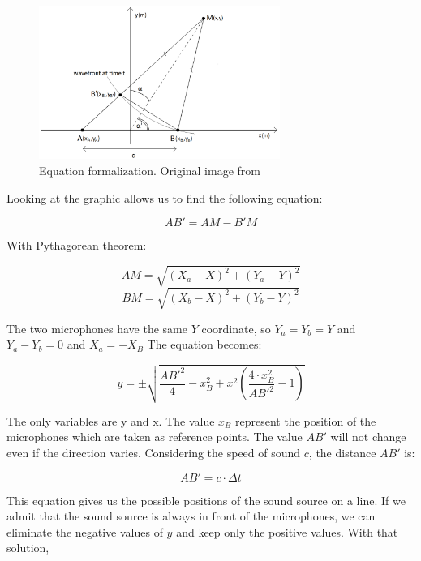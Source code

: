 \begin{figure}[H]
    \centering
    \includegraphics[width=0.7\textwidth]{../Images/sound-source-from-two-microphones.png}
    \caption{Equation formalization. Original image from \cite{Scola2010DirectionOA}}
    \label{fig:sound-source-from-two-microphones}
\end{figure}

Looking at the graphic allows us to find the following equation:

\begin{equation}
    AB' = AM-B'M
\end{equation}

With Pythagorean theorem: 

\begin{equation}
    AM = \sqrt{(X_{a}-X)^2 + (Y_{a}-Y)^2}
\end{equation}
\begin{equation}
    BM = \sqrt{(X_{b}-X)^2 + (Y_{b}-Y)^2}
\end{equation}

The two microphones have the same $Y$ coordinate, so $Y_{a} = Y_{b} = Y$ and $Y_{a}-Y_{b} = 0$ and $X_{a} = -X_{B}$ The equation becomes:

\begin{equation}
    y = \pm\sqrt{\frac{AB'^2}{4} - x^2_{B} + x^2(\frac{4\cdot x^2_{B}}{AB'^2} - 1)}
\end{equation}

The only variables are y and x. The value $x_{B}$ represent the position of the microphones which are taken as reference points. The value $AB'$ will not change even if the direction varies. Considering the speed of sound $c$, the distance $AB'$ is:

\begin{equation}
    AB' = c \cdot \Delta t
\end{equation}

This equation gives us the possible positions of the sound source on a line. If we admit that the sound source is always in front of the microphones, we can eliminate the negative values of $y$ and keep only the positive values. With that solution, 

